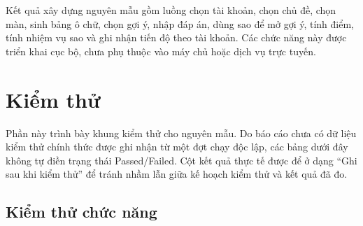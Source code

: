 \documentclass[../DoAn.tex]{subfiles}
\begin{document}
Kết quả xây dựng nguyên mẫu gồm luồng chọn tài khoản, chọn chủ đề, chọn màn, sinh bảng ô chữ, chọn gợi ý, nhập đáp án, dùng sao để mở gợi ý, tính điểm, tính nhiệm vụ sao và ghi nhận tiến độ theo tài khoản. Các chức năng này được triển khai cục bộ, chưa phụ thuộc vào máy chủ hoặc dịch vụ trực tuyến.

\section{Kiểm thử}
\label{section:4.7}

Phần này trình bày khung kiểm thử cho nguyên mẫu. Do báo cáo chưa có dữ liệu kiểm thử chính thức được ghi nhận từ một đợt chạy độc lập, các bảng dưới đây không tự điền trạng thái Passed/Failed. Cột kết quả thực tế được để ở dạng ``Ghi sau khi kiểm thử'' để tránh nhầm lẫn giữa kế hoạch kiểm thử và kết quả đã đo.

\subsection{Kiểm thử chức năng}
\end{document}
